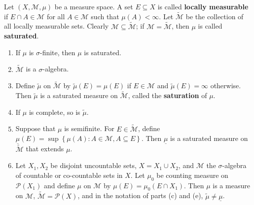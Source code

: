 \begin{exercise}
    Let \( (X, \mathcal{M}, \mu) \) be a measure space. A set \( E \subseteq X \) is called \textbf{locally measurable} if \( E \cap A \in \mathcal{M} \) for all \( A \in \mathcal{M} \) such that \( \mu(A) < \infty \). Let \( \widetilde{\mathcal{M}} \) be the collection of all locally measurable sets. Clearly \( \mathcal{M} \subseteq \widetilde{\mathcal{M}} \); if \( \mathcal{M} = \widetilde{\mathcal{M}} \), then \( \mu \) is called \textbf{saturated}.
    \begin{enumerate}[itemsep=0pt,label=\textbf{\alph*.}]
        \item If \( \mu \) is \( \sigma \)-finite, then \( \mu \) is saturated.
        \item \( \widetilde{\mathcal{M}} \) is a \( \sigma \)-algebra.
        \item Define \( \widetilde{\mu} \) on \( \widetilde{\mathcal{M}} \) by \( \widetilde{\mu}(E) = \mu(E) \) if \( E \in \mathcal{M} \) and \( \widetilde{\mu}(E) = \infty \) otherwise. Then \( \widetilde{\mu} \) is a saturated measure on \( \widetilde{\mathcal{M}} \), called the \textbf{saturation} of \( \mu \).
        \item If \( \mu \) is complete, so is \( \widetilde{\mu} \).
        \item Suppose that \( \mu \) is semifinite. For \( E \in \widetilde{\mathcal{M}} \), define \( \underline{\mu}(E) = \sup\left\{ \mu(A) : A \in \mathcal{M}, A \subseteq E \right\} \). Then \( \underline{\mu} \) is a saturated measure on \( \widetilde{\mathcal{M}} \) that extends \( \mu \).
        \item Let \( X_{1}, X_{2} \) be disjoint uncountable sets, \( X = X_{1} \cup X_{2} \), and \( \mathcal{M} \) the \( \sigma \)-algebra of countable or co-countable sets in \( X \). Let \( \mu_{0} \) be counting measure on \( \mathcal{P}(X_{1}) \) and define \( \mu \) on \( \mathcal{M} \) by \( \mu(E) = \mu_{0}(E \cap X_{1}) \). Then \( \mu \) is a measure on \( \mathcal{M} \), \( \widetilde{\mathcal{M}} = \mathcal{P}(X) \), and in the notation of parts (c) and (e), \( \widetilde{\mu} \ne \underline{\mu} \).
    \end{enumerate}
\end{exercise}

